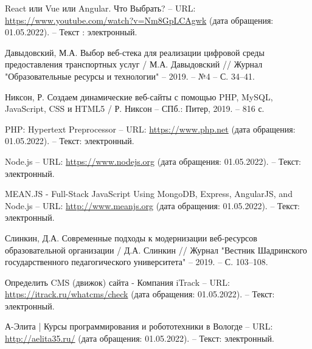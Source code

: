\begin{thebibliography}{00}
        React или Vue или Angular. Что Выбрать?
        --
        URL:
        \href{https://www.youtube.com/watch?v=Nm8GpLCAgwk}{https://www.youtube.com/watch?v=Nm8GpLCAgwk}
        (дата обращения: 01.05.2022).
        --
        Текст : электронный.

        Давыдовский, М.А. Выбор веб-стека для реализации цифровой среды предоставления транспортных услуг
        /
        М.А. Давыдовский
        //
        Журнал "Образовательные ресурсы и технологии"
        --
        2019.
        --
        №4
        --
        С. 34--41.

        Никсон, Р. Создаем динамические веб-сайты с помощью PHP, MySQL, JavaScript, CSS и HTML5
        /
        Р. Никсон
        --
        СПб.: Питер,
        2019.
        --
        816 с.

        PHP: Hypertext Preprocessor
        --
        URL:
        \href{https://www.php.net}{https://www.php.net}
        (дата обращения: 01.05.2022).
        --
        Текст: электронный.

        Node.js
        --
        URL:
        \href{https://www.nodejs.org}{https://www.nodejs.org}
        (дата обращения: 01.05.2022).
        --
        Текст: электронный.


        MEAN.JS - Full-Stack JavaScript Using MongoDB, Express, AngularJS, and Node.js
        --
        URL:
        \href{http://www.meanjs.org}{http://www.meanjs.org}
        (дата обращения: 01.05.2022).
        --
        Текст: электронный.

        Слинкин, Д.А. Современные подходы к модернизации веб-ресурсов образовательной организации
        /
        Д.А. Слинкин
        //
        Журнал "Вестник Шадринского государственного педагогического университета"
        --
        2019.
        --
        С. 103--108.

        Определить CMS (движок) сайта - Компания iTrack
        --
        URL:
        \href{https://itrack.ru/whatcms/check}{https://itrack.ru/whatcms/check}
        (дата обращения: 01.05.2022).
        --
        Текст: электронный.

        А-Элита | Курсы программирования и робототехники в Вологде
        --
        URL:
        \href{http://aelita35.ru/}{http://aelita35.ru/}
        (дата обращения: 01.05.2022).
        --
        Текст: электронный.


\end{thebibliography}

